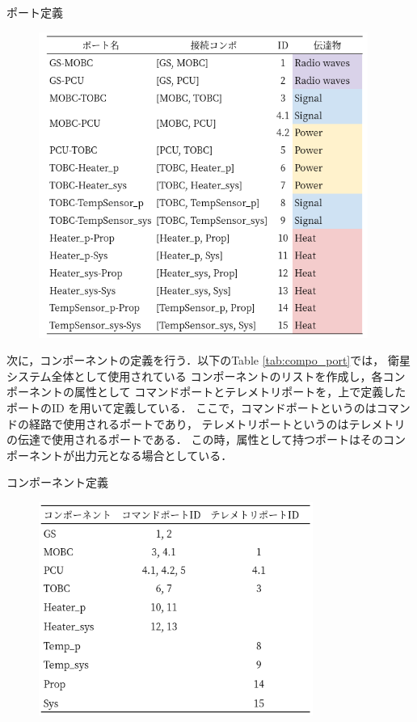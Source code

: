 \documentclass[11pt]{article}
\begin{document}
\newpage
\begin{table}[H]
   \centering
   \caption{ポート定義} 
   \label{tab:port_definition}
\end{table} 
\vspace{-2zh}
\begin{figure}[H]
   \centering
      \includegraphics[height=10cm]{figure/port_definition.png}
\end{figure}
次に，コンポーネントの定義を行う．以下のTable \ref{tab:compo_port}では，
衛星システム全体として使用されている
コンポーネントのリストを作成し，各コンポーネントの属性として
コマンドポートとテレメトリポートを，上で定義したポートのID
を用いて定義している．
ここで，コマンドポートというのはコマンドの経路で使用されるポートであり，
テレメトリポートというのはテレメトリの伝達で使用されるポートである．
この時，属性として持つポートはそのコンポーネントが出力元となる場合としている．

\begin{table}[H]
   \centering
   \caption{コンポーネント定義} 
   \label{tab:compo_port}
\end{table}
\vspace{-2zh}
\begin{figure}[H]
   \centering
      \includegraphics[height=7cm]{figure/compo_port.png}
\end{figure}
\end{document}
